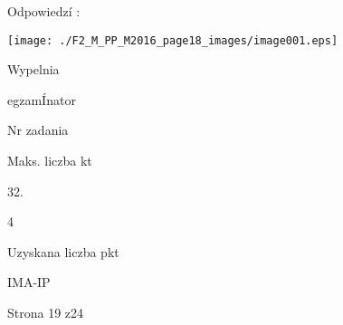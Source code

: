\documentclass[a4paper,12pt]{article}
\begin{document}
Odpowiedzí :
\begin{center}
\texttt{[image: ./F2\_M\_PP\_M2016\_page18\_images/image001.eps]}
\end{center}
Wypelnia

egzamÍnator

Nr zadania

Maks. liczba kt

32.

4

Uzyskana liczba pkt

IMA-IP

Strona 19 z24
\end{document}
